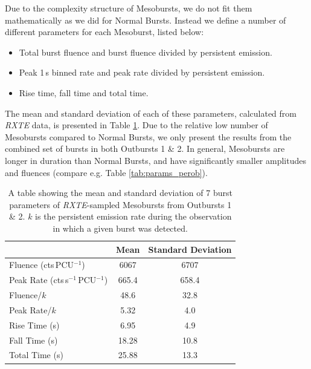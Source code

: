 \label{sec:mesostruc}

\par Due to the complexity structure of Mesobursts, we do not fit them mathematically as we did for Normal Bursts.  Instead we define a number of different parameters for each Mesoburst, listed below:
\begin{itemize}
\item Total burst fluence and burst fluence divided by persistent emission.
\item Peak 1\,s binned rate and peak rate divided by persistent emission.
\item Rise time, fall time and total time.
\end{itemize}
\par The mean and standard deviation of each of these parameters, calculated from \textit{RXTE} data, is presented in Table \ref{tab:meso_param}.  Due to the relative low number of Mesobursts compared to Normal Bursts, we only present the results from the combined set of bursts in both Outbursts 1 \& 2.  In general, Mesobursts are longer in duration than Normal Bursts, and have significantly smaller amplitudes and fluences (compare e.g. Table \ref{tab:params_perob}).

\begin{table}
\centering
\begin{tabular}{l c c}
\hline
\hline
&Mean&Standard Deviation\\
\hline
Fluence \scriptsize(cts\,PCU$^{-1}$)&6067&6707\\
Peak Rate \scriptsize(cts\,s$^{-1}$\,PCU$^{-1}$)&665.4&658.4\\
Fluence/$k$&48.6&32.8\\
Peak Rate/$k$&5.32&4.0\\
Rise Time \scriptsize(s)&6.95&4.9\\
Fall Time \scriptsize(s)&18.28&10.8\\
Total Time \scriptsize(s)&25.88&13.3\\
\hline
\hline
\end{tabular}
\caption[A table showing the mean and standard deviation of 7 burst parameters of \textit{RXTE}-sampled Mesobursts from Outbursts 1 \& 2.]{A table showing the mean and standard deviation of 7 burst parameters of \textit{RXTE}-sampled Mesobursts from Outbursts 1 \& 2.  $k$ is the persistent emission rate during the observation in which a given burst was detected.}
\label{tab:meso_param}
\end{table}

